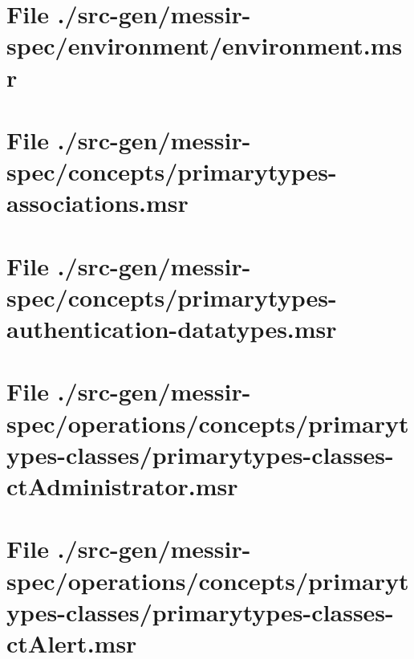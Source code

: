 \section[File /src-gen/messir-spec/environment/environment.msr]{File ./src-gen/messir-spec/environment/environment.msr}
\scriptsize

\normalsize
	
\section[File /src-gen/messir-spec/concepts/primarytypes-associations.msr]{File ./src-gen/messir-spec/concepts/primarytypes-associations.msr}
\scriptsize

\normalsize
	
\section[File /src-gen/messir-spec/concepts/primarytypes-authentication-datatypes.msr]{File ./src-gen/messir-spec/concepts/primarytypes-authentication-datatypes.msr}
\scriptsize

\normalsize
	
\section[File /src-gen/messir-spec.../primarytypes-classes-ctAdministrator.msr]{File ./src-gen/messir-spec/operations/concepts/primarytypes-classes/primarytypes-classes-ctAdministrator.msr}
\scriptsize

\normalsize
	
\section[File /src-gen/messir-spec/operations.../primarytypes-classes-ctAlert.msr]{File ./src-gen/messir-spec/operations/concepts/primarytypes-classes/primarytypes-classes-ctAlert.msr}
\scriptsize

\normalsize
	
